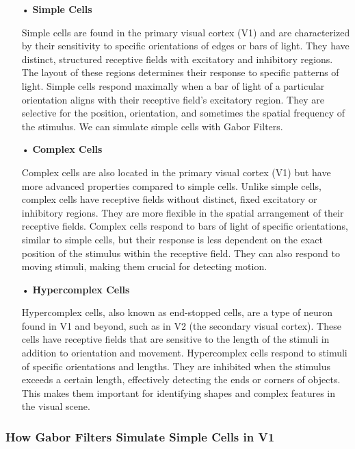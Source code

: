 \documentclass[12pt]{article}
\begin{document}
\begin{itemize}

\item[•] \textbf{Simple Cells}

Simple cells are found in the primary visual cortex (V1) and are characterized by their sensitivity to specific orientations of edges or bars of light. They have distinct, structured receptive fields with excitatory and inhibitory regions. The layout of these regions determines their response to specific patterns of light. Simple cells respond maximally when a bar of light of a particular orientation aligns with their receptive field's excitatory region. They are selective for the position, orientation, and sometimes the spatial frequency of the stimulus. We can simulate simple cells with Gabor Filters.

\item[•] \textbf{Complex Cells}

 Complex cells are also located in the primary visual cortex (V1) but have more advanced properties compared to simple cells. Unlike simple cells, complex cells have receptive fields without distinct, fixed excitatory or inhibitory regions. They are more flexible in the spatial arrangement of their receptive fields. Complex cells respond to bars of light of specific orientations, similar to simple cells, but their response is less dependent on the exact position of the stimulus within the receptive field. They can also respond to moving stimuli, making them crucial for detecting motion.

\item[•] \textbf{Hypercomplex Cells}

Hypercomplex cells, also known as end-stopped cells, are a type of neuron found in V1 and beyond, such as in V2 (the secondary visual cortex). These cells have receptive fields that are sensitive to the length of the stimuli in addition to orientation and movement. Hypercomplex cells respond to stimuli of specific orientations and lengths. They are inhibited when the stimulus exceeds a certain length, effectively detecting the ends or corners of objects. This makes them important for identifying shapes and complex features in the visual scene.
\end{itemize}

\subsubsection{How Gabor Filters Simulate Simple Cells in V1}
\end{document}
